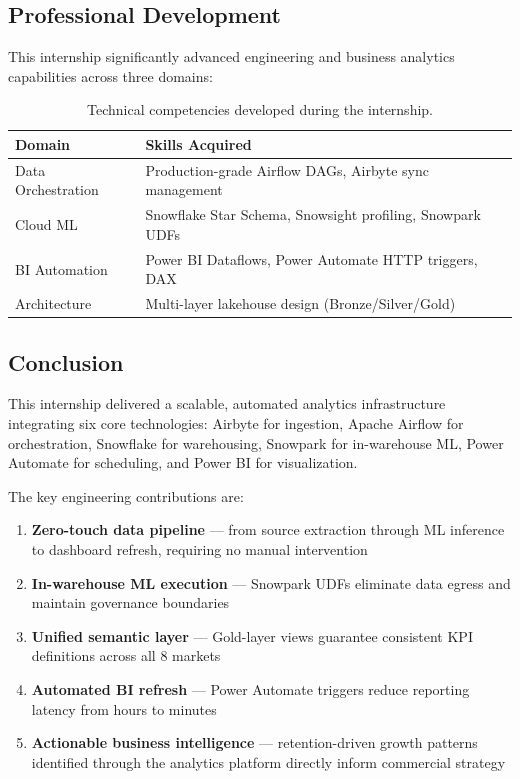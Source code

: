 \documentclass[11pt,a4paper]{article}
\begin{document}
\subsection{Professional Development}

This internship significantly advanced engineering and business analytics capabilities across three domains:

\begin{table}[H]
\caption{Technical competencies developed during the internship.}
\setlength{\tabcolsep}{16pt}
\renewcommand{\arraystretch}{1.4}
\begin{tabular}{l l}
\toprule
\textbf{Domain} & \textbf{Skills Acquired} \\
\midrule
Data Orchestration & Production-grade Airflow DAGs, Airbyte sync management \\
Cloud ML & Snowflake Star Schema, Snowsight profiling, Snowpark UDFs \\
BI Automation & Power BI Dataflows, Power Automate HTTP triggers, DAX \\
Architecture & Multi-layer lakehouse design (Bronze/Silver/Gold) \\
\bottomrule
\end{tabular}
\end{table}

\subsection{Conclusion}

This internship delivered a scalable, automated analytics infrastructure integrating six core technologies: Airbyte for ingestion, Apache Airflow for orchestration, Snowflake for warehousing, Snowpark for in-warehouse ML, Power Automate for scheduling, and Power BI for visualization.

The key engineering contributions are:
\begin{enumerate}[leftmargin=*,noitemsep,topsep=2pt]
    \item \textbf{Zero-touch data pipeline} --- from source extraction through ML inference to dashboard refresh, requiring no manual intervention
    \item \textbf{In-warehouse ML execution} --- Snowpark UDFs eliminate data egress and maintain governance boundaries
    \item \textbf{Unified semantic layer} --- Gold-layer views guarantee consistent KPI definitions across all 8 markets
    \item \textbf{Automated BI refresh} --- Power Automate triggers reduce reporting latency from hours to minutes
    \item \textbf{Actionable business intelligence} --- retention-driven growth patterns identified through the analytics platform directly inform commercial strategy
\end{enumerate}
\end{document}
